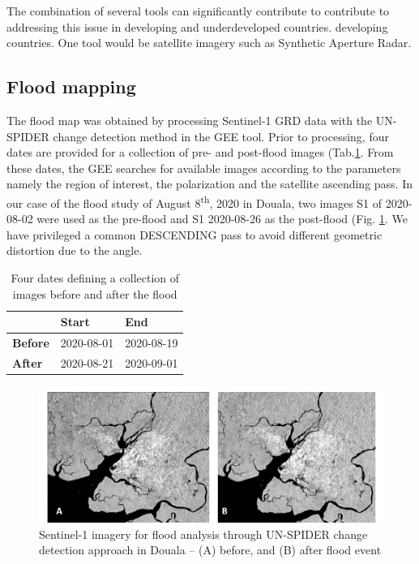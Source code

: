 The combination of several tools can significantly contribute to contribute to addressing this issue in developing and underdeveloped countries. developing countries. One tool would be satellite imagery such as Synthetic Aperture Radar.

\subsection{Flood mapping}
The flood map was obtained by processing Sentinel-1 GRD data with the UN-SPIDER change detection method in the GEE tool. Prior to processing, four dates are provided for a collection of pre- and post-flood images (Tab.\ref{tab:collectionofimage}. From these dates, the GEE searches for available images according to the parameters namely the region of interest, the polarization and the satellite ascending pass. In our case of the flood study of August  8\textsuperscript{th}, 2020 in Douala, two images S1 of 2020-08-02 were used as the pre-flood and S1 2020-08-26 as the post-flood (Fig. \ref{fig:pre_post_flood}. We have privileged a common DESCENDING pass to avoid different geometric distortion due to the angle.
\begin{table}[hbt!]\centering
\caption{Four dates defining a collection of images before and after the flood}
\begin{tabular}{lll}
\hline
\textbf{}       & \textbf{Start} & \textbf{End} \\
\hline
\textbf{Before} & 2020-08-01     & 2020-08-19   \\
\textbf{After}  & 2020-08-21     & 2020-09-01  \\
\hline
\end{tabular}\label{tab:collectionofimage}
\end{table}

\begin{figure} %
	\centering
	\includegraphics[width=5in]{figure/changedetection.png}
	\caption{Sentinel-1 imagery for flood analysis through UN-SPIDER change detection approach in Douala – (A) before, and (B) after flood event}

	\label{fig:pre_post_flood}
\end{figure}

